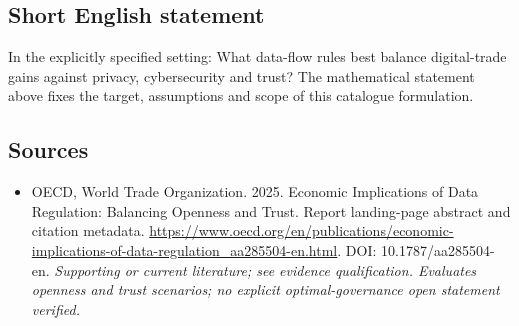\documentclass[11pt]{article}
\begin{document}
\subsection{Short English statement}
In the explicitly specified setting: What data-flow rules best balance digital-trade gains against privacy, cybersecurity and trust? The mathematical statement above fixes the target, assumptions and scope of this catalogue formulation.

\subsection{Sources}
\begin{itemize}\raggedright
\item[\textnormal{[S1]}]\hypertarget{source:30007629:1}{} OECD, World Trade Organization. 2025. Economic Implications of Data Regulation: Balancing Openness and Trust. Report landing-page abstract and citation metadata.
\url{https://www.oecd.org/en/publications/economic-implications-of-data-regulation_aa285504-en.html}.
DOI: 10.1787/aa285504-en.
{\small\textit{Supporting or current literature; see evidence qualification. Evaluates openness and trust scenarios; no explicit optimal-governance open statement verified.}}
\end{itemize}
\end{document}
